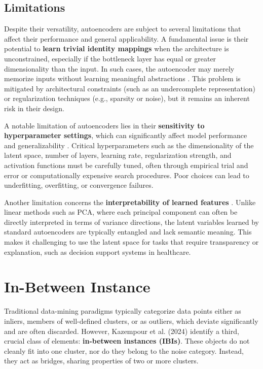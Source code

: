 \subsection{Limitations}

Despite their versatility, autoencoders are subject to several limitations that affect their performance and general applicability. A fundamental issue is their potential to \textbf{learn trivial identity mappings} when the architecture is unconstrained, especially if the bottleneck layer has equal or greater dimensionality than the input. In such cases, the autoencoder may merely memorize inputs without learning meaningful abstractions \cite{Goodfellow16}. This problem is mitigated by architectural constraints (such as an undercomplete representation) or regularization techniques (e.g., sparsity or noise), but it remains an inherent risk in their design.

A notable limitation of autoencoders lies in their \textbf{sensitivity to hyperparameter settings}, which can significantly affect model performance and generalizability \cite{Berahmand24}. Critical hyperparameters such as the dimensionality of the latent space, number of layers, learning rate, regularization strength, and activation functions must be carefully tuned, often through empirical trial and error or computationally expensive search procedures. Poor choices can lead to underfitting, overfitting, or convergence failures.

Another limitation concerns the \textbf{interpretability of learned features} \cite{Bengio14}. Unlike linear methods such as PCA, where each principal component can often be directly interpreted in terms of variance directions, the latent variables learned by standard autoencoders are typically entangled and lack semantic meaning. This makes it challenging to use the latent space for tasks that require transparency or explanation, such as decision support systems in healthcare.

\section{In-Between Instance}

Traditional data-mining paradigms typically categorize data points either as inliers, members of well-defined clusters, or as outliers, which deviate significantly and are often discarded. However, Kazempour et al. (2024) \cite{Kazempour24} identify a third, crucial class of elements: \textbf{in-between instances (IBIs)}. These objects do not cleanly fit into one cluster, nor do they belong to the noise category. Instead, they act as bridges, sharing properties of two or more clusters.

